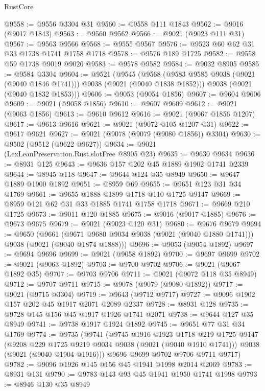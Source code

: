 \begin{lexlean}{RustCore}
\begin{coremodule}
@9558 := @9556 @3304 @31
@9560 := @9558 @111 @1843
@9562 := @9016 (@9017 @1843)
@9563 := @9560 @9562
@9566 := @9021 (@9023 @111 @31)
@9567 := @9563 @9566
@9568 := @9555 @9567
@9576 := @9523 @60 @62 @31 @33 @1738 @1741 @1758 @1718
@9578 := @9576 @189 @1725
@9582 := @9558 @59 @1738 @9019 @9026
@9583 := @9578 @9582
@9584 := @9032 @8905
@9585 := @9584 @3304
@9604 := @9521
    (@9545
      (@9568 (@9583 @9585 @9038 (@9021 (@9040 @1846 @1741))) @9038 (@9021 (@9040 @1838 @1852)))
      @9038
      (@9021 (@9040 @1832 @1853)))
@9606 := @9053 (@9054 @1856)
@9607 := @9604 @9606
@9609 := @9021 (@9058 @1856)
@9610 := @9607 @9609
@9612 := @9021 (@9063 @1856)
@9613 := @9610 @9612
@9616 := @9021 (@9067 @1856 @1207)
@9617 := @9613 @9616
@9621 := @9021 (@9072 @105 @1207 @31)
@9622 := @9617 @9621
@9627 := @9021 (@9078 (@9079 (@9080 @1856)) @3304)
@9630 := @9502 (@9512 (@9622 @9627))
@9634 := @9021 (LexLeanPreservation.Rust.slotFree @8905 @23)
@9635 := @9630 @9634
@9636 := @8931 @125
@9643 := @9636 @157 @202 @45 @1889 @1902 @1741 @2339
@9644 := @8945 @118
@9647 := @9644 @124 @35 @8949
@9650 := @9647 @1889 @1900 @1892
@9651 := @8959 @69
@9655 := @9651 @123 @31 @34 @1769
@9661 := @9655 @1888 @1899 @1718 @110 @1725 @9147
@9669 := @8959 @121 @62 @31 @33 @1885 @1741 @1758 @1718
@9671 := @9669 @210 @1725
@9673 := @9011 @120 @1885
@9675 := @9016 (@9017 @1885)
@9676 := @9673 @9675
@9679 := @9021 (@9023 @120 @31)
@9680 := @9676 @9679
@9694 := @9650
    (@9661 (@9671 @9680 @9034 @9038 (@9021 (@9040 @1880 @1741))) @9038 (@9021 (@9040 @1874 @1888)))
@9696 := @9053 (@9054 @1892)
@9697 := @9694 @9696
@9699 := @9021 (@9058 @1892)
@9700 := @9697 @9699
@9702 := @9021 (@9063 @1892)
@9703 := @9700 @9702
@9706 := @9021 (@9067 @1892 @35)
@9707 := @9703 @9706
@9711 := @9021 (@9072 @118 @35 @8949)
@9712 := @9707 @9711
@9715 := @9078 (@9079 (@9080 @1892))
@9717 := @9021 (@9715 @3304)
@9719 := @9643 (@9712 @9717)
@9727 := @9096 @1902 @157 @202 @45 @1917 @2071 @2089 @2337
@9728 := @8931 @128
@9735 := @9728 @145 @156 @45 @1917 @1926 @1741 @2071
@9738 := @9644 @127 @35 @8949
@9741 := @9738 @1917 @1924 @1892
@9745 := @9651 @77 @31 @34 @1769
@9774 := @9735
    (@9741
      (@9745
        @1916
        @1923
        @1718
        @219
        @1725
        @9147
        (@9208 @229 @1725 @9219 @9034 @9038 (@9021 (@9040 @1910 @1741)))
        @9038
        (@9021 (@9040 @1904 @1916)))
      @9696
      @9699
      @9702
      @9706
      @9711
      @9717)
@9782 := @9096 @1926 @145 @156 @45 @1941 @1998 @2014 @2069
@9783 := @8931 @131
@9790 := @9783 @143 @93 @45 @1941 @1950 @1741 @1998
@9793 := @8946 @130 @35 @8949

\end{coremodule}
\end{lexlean}

